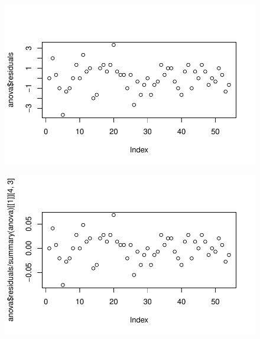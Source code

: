 \documentclass[
  letterpaper,
  DIV=11,
  numbers=noendperiod]{scrartcl}
\newenvironment{Shaded}{\begin{snugshade}}{\end{snugshade}}
\newcommand{\DecValTok}[1]{\textcolor[rgb]{0.68,0.00,0.00}{#1}}
\newcommand{\FunctionTok}[1]{\textcolor[rgb]{0.28,0.35,0.67}{#1}}
\newcommand{\NormalTok}[1]{\textcolor[rgb]{0.00,0.23,0.31}{#1}}
\newcommand{\SpecialCharTok}[1]{\textcolor[rgb]{0.37,0.37,0.37}{#1}}
\begin{document}
\begin{figure}[H]

{\centering \includegraphics{fatorial_multi_files/figure-pdf/unnamed-chunk-6-1.pdf}

}

\end{figure}

\begin{Shaded}
\end{Shaded}

\begin{figure}[H]

{\centering \includegraphics{fatorial_multi_files/figure-pdf/unnamed-chunk-6-2.pdf}

}

\end{figure}
\end{document}
